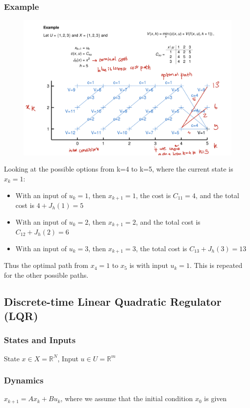 \documentclass{article}
\begin{document}
\subsubsection*{Example}
\begin{figure}[H]
\includegraphics[width = \linewidth]{example1.png}
\end{figure}
Looking at the possible options from k=4 to k=5, where the current state is $x_k = 1$:
\begin{itemize}
    \item With an input of $u_k = 1$, then $x_{k+1} = 1$, the cost is $C_{11} = 4$, and the total cost is $4 + J_h(1) = 5$
    \item With an input of $u_k = 2$, then $x_{k+1} = 2$, and the total cost is $C_{12} + J_h(2) = 6$
    \item With an input of $u_k = 3$, then $x_{k+1} = 3$, the total cost is $C_{13} + J_h(3) = 13$
\end{itemize}
Thus the optimal path from $x_4=1$ to $x_5$ is with input $u_k = 1$.
This is repeated for the other possible paths.
\subsection{Discrete-time Linear Quadratic Regulator (LQR)}
\subsubsection*{States and Inputs}
State $x \in X = \mathbb{R}^N$, Input $u \in U = \mathbb{R}^m$
\\ 
\subsubsection*{Dynamics}
$x_{k+1} = A x_k + B u_k$, where we assume that the initial condition $x_0$ is given
\end{document}
